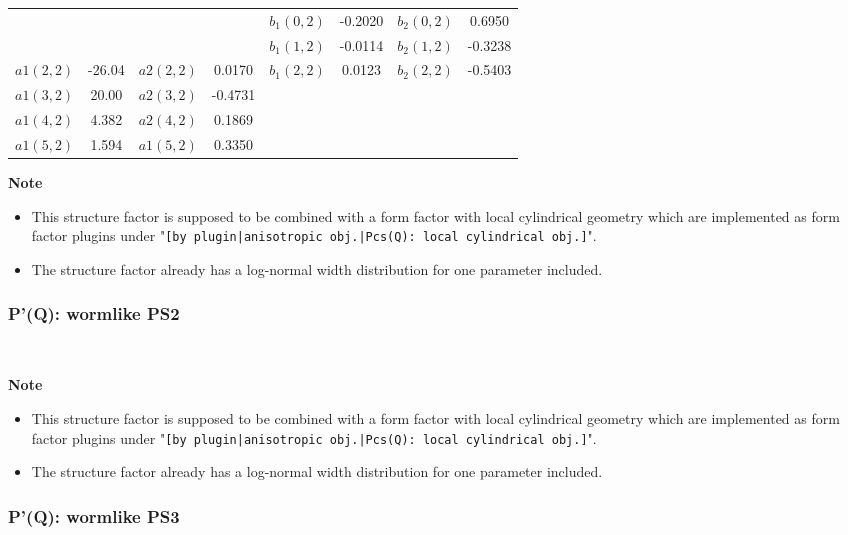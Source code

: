 \begin{table}
\begin{tabular}{l c|l c|l c|l c}
               &          &           &          & $b_1(0,2)$ & -0.2020	 & $b_2(0,2)$ &  0.6950  \\
               &          &           &          & $b_1(1,2)$ & -0.0114  & $b_2(1,2)$ & -0.3238  \\
     $a1(2,2)$ & -26.04   & $a2(2,2)$ &  0.0170  & $b_1(2,2)$ &  0.0123  & $b_2(2,2)$ & -0.5403  \\
     $a1(3,2)$ &  20.00   & $a2(3,2)$ & -0.4731  &            &          &            &          \\
     $a1(4,2)$ &  4.382   & $a2(4,2)$ &  0.1869  &            &          &            &          \\
     $a1(5,2)$ &  1.594   & $a1(5,2)$ &  0.3350  &            &          &            &          \\
     \hline
   \end{tabular}
\end{table}


\noindent
\textbf{Note}
\begin{itemize}
  \item This structure factor is supposed to be combined with a form factor with local cylindrical geometry which are implemented as form factor plugins
under "\texttt{[by plugin|anisotropic obj.|Pcs(Q): local cylindrical obj.]}".
\item The structure factor already has a log-normal width distribution for one parameter included.
\end{itemize}

\clearpage
\subsubsection{P'(Q): wormlike PS2} ~\\
\label{plugin:Pprime4wormPS2}

\noindent
\textbf{Note}
\begin{itemize}
  \item This structure factor is supposed to be combined with a form factor with local cylindrical geometry which are implemented as form factor plugins
under "\texttt{[by plugin|anisotropic obj.|Pcs(Q): local cylindrical obj.]}".
\item The structure factor already has a log-normal width distribution for one parameter included.
\end{itemize}

\clearpage
\subsubsection{P'(Q): wormlike PS3} ~\\
\label{plugin:Pprime4wormPS3}

